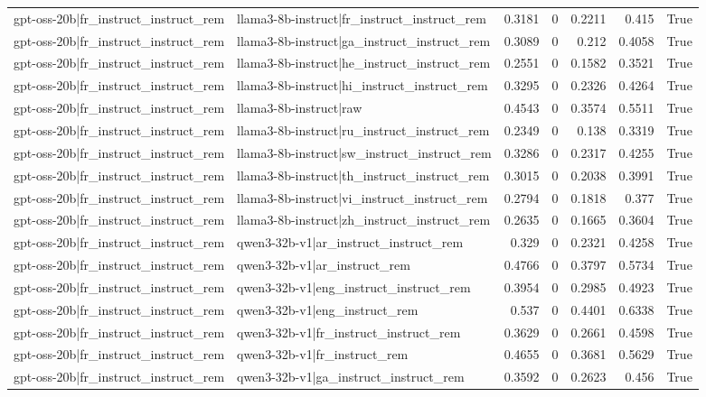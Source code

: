 \begin{table}
\begin{tabular}{l l r r r r l}
gpt-oss-20b|fr_instruct_instruct_rem & llama3-8b-instruct|fr_instruct_instruct_rem & 0.3181 & 0 & 0.2211 & 0.415 & True \\
gpt-oss-20b|fr_instruct_instruct_rem & llama3-8b-instruct|ga_instruct_instruct_rem & 0.3089 & 0 & 0.212 & 0.4058 & True \\
gpt-oss-20b|fr_instruct_instruct_rem & llama3-8b-instruct|he_instruct_instruct_rem & 0.2551 & 0 & 0.1582 & 0.3521 & True \\
gpt-oss-20b|fr_instruct_instruct_rem & llama3-8b-instruct|hi_instruct_instruct_rem & 0.3295 & 0 & 0.2326 & 0.4264 & True \\
gpt-oss-20b|fr_instruct_instruct_rem & llama3-8b-instruct|raw & 0.4543 & 0 & 0.3574 & 0.5511 & True \\
gpt-oss-20b|fr_instruct_instruct_rem & llama3-8b-instruct|ru_instruct_instruct_rem & 0.2349 & 0 & 0.138 & 0.3319 & True \\
gpt-oss-20b|fr_instruct_instruct_rem & llama3-8b-instruct|sw_instruct_instruct_rem & 0.3286 & 0 & 0.2317 & 0.4255 & True \\
gpt-oss-20b|fr_instruct_instruct_rem & llama3-8b-instruct|th_instruct_instruct_rem & 0.3015 & 0 & 0.2038 & 0.3991 & True \\
gpt-oss-20b|fr_instruct_instruct_rem & llama3-8b-instruct|vi_instruct_instruct_rem & 0.2794 & 0 & 0.1818 & 0.377 & True \\
gpt-oss-20b|fr_instruct_instruct_rem & llama3-8b-instruct|zh_instruct_instruct_rem & 0.2635 & 0 & 0.1665 & 0.3604 & True \\
gpt-oss-20b|fr_instruct_instruct_rem & qwen3-32b-v1|ar_instruct_instruct_rem & 0.329 & 0 & 0.2321 & 0.4258 & True \\
gpt-oss-20b|fr_instruct_instruct_rem & qwen3-32b-v1|ar_instruct_rem & 0.4766 & 0 & 0.3797 & 0.5734 & True \\
gpt-oss-20b|fr_instruct_instruct_rem & qwen3-32b-v1|eng_instruct_instruct_rem & 0.3954 & 0 & 0.2985 & 0.4923 & True \\
gpt-oss-20b|fr_instruct_instruct_rem & qwen3-32b-v1|eng_instruct_rem & 0.537 & 0 & 0.4401 & 0.6338 & True \\
gpt-oss-20b|fr_instruct_instruct_rem & qwen3-32b-v1|fr_instruct_instruct_rem & 0.3629 & 0 & 0.2661 & 0.4598 & True \\
gpt-oss-20b|fr_instruct_instruct_rem & qwen3-32b-v1|fr_instruct_rem & 0.4655 & 0 & 0.3681 & 0.5629 & True \\
gpt-oss-20b|fr_instruct_instruct_rem & qwen3-32b-v1|ga_instruct_instruct_rem & 0.3592 & 0 & 0.2623 & 0.456 & True \\

\end{tabular}
\end{table}
